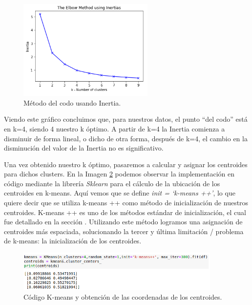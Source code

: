 \documentclass[12pt,a4paper]{article}
\begin{document}
\begin{sloppypar}
\begin{figure}[H]   
\centering
\includegraphics[width=0.6\textwidth]{images/implementacion_5/elbow_method_inertia.png}
\caption{Método del codo usando Inertia.}
\label{fig:elbow_method_inertia}
\end{figure}

Viendo este gráfico concluimos que, para nuestros datos, el punto “del codo” está en k=4, siendo 4 nuestro k óptimo. A partir de k=4 la Inertia comienza a disminuir de forma lineal, o dicho de otra forma, después de k=4, el cambio en la disminución del valor de la Inertia no es significativo. 

\cleardoublepage

Una vez obtenido nuestro k óptimo, pasaremos a calcular y asignar los centroides para dichos clusters. En la Imagen \ref{fig:codigo_k-means} podemos observar la implementación en código mediante la librería \textit{Sklearn} para el cálculo de la ubicación de los centroides en k-means. Aquí vemos que se define \textit{init = ‘k-means ++’}, lo que quiere decir que se utiliza k-means ++ como método de inicialización de nuestros centroides. K-means ++ es uno de los métodos estándar de inicialización, el cual fue detallado en la sección \textit{}. Utilizando este método logramos una asignación de centroides más espaciada, solucionando la tercer y última limitación / problema de k-means: la inicialización de los centroides.

\begin{figure}[H]   
\centering
\includegraphics[width=0.9\textwidth]{images/implementacion_5/codigo_k-means.png}
\captionsetup{justification=centering,margin=3cm}
\caption{Código K-means y obtención de las coordenadas de los centroides.}
\label{fig:codigo_k-means}
\end{figure}


\end{sloppypar}
\end{document}
